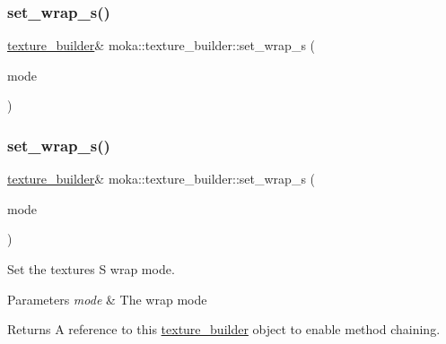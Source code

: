 \subsubsection{\texorpdfstring{set\_wrap\_s()}{set\_wrap\_s()}\hspace{0.1cm}{\footnotesize\ttfamily [1/2]}}
{\footnotesize\ttfamily \mbox{\hyperlink{classmoka_1_1texture__builder}{texture\+\_\+builder}}\& moka\+::texture\+\_\+builder\+::set\+\_\+wrap\+\_\+s (\begin{DoxyParamCaption}\item[{\mbox{\hyperlink{namespacemoka_afda3faa87bacaacc6008d8c1f73f6462}{wrap\+\_\+mode}}}]{mode }\end{DoxyParamCaption})}

\mbox{\label{classmoka_1_1texture__builder_a555d3ea33ae09a175916eee13df9170c}} 
\subsubsection{\texorpdfstring{set\_wrap\_s()}{set\_wrap\_s()}\hspace{0.1cm}{\footnotesize\ttfamily [2/2]}}
{\footnotesize\ttfamily \mbox{\hyperlink{classmoka_1_1texture__builder}{texture\+\_\+builder}}\& moka\+::texture\+\_\+builder\+::set\+\_\+wrap\+\_\+s (\begin{DoxyParamCaption}\item[{\mbox{\hyperlink{namespacemoka_afda3faa87bacaacc6008d8c1f73f6462}{wrap\+\_\+mode}}}]{mode }\end{DoxyParamCaption})}



Set the texture\textquotesingle{}s S wrap mode. 


\begin{DoxyParams}{Parameters}
{\em mode} & The wrap mode \\
\hline
\end{DoxyParams}
\begin{DoxyReturn}{Returns}
A reference to this \mbox{\hyperlink{classmoka_1_1texture__builder}{texture\+\_\+builder}} object to enable method chaining. 
\end{DoxyReturn}
\mbox{\label{classmoka_1_1texture__builder_a450b409d8c9fac1a54c89130825a6c9f}} 
